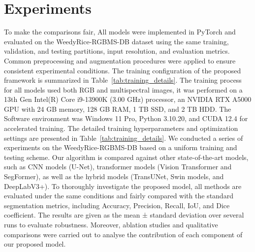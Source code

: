 \documentclass[pdflatex,sn-mathphys-num]{sn-jnl}
\begin{document}
\section{Experiments}
To make the comparisons fair, All models were implemented in PyTorch and evaluated on the WeedyRice-RGBMS-DB dataset
using the same training, validation, and
testing partitions, input resolution, and
evaluation metrics. Common preprocessing
and augmentation procedures were applied
to ensure consistent experimental conditions.
The training configuration of the proposed
framework is summarized in
Table~\ref{tab:training_details}. 
The training process for all models used both RGB and multispectral images, it was performed on a 13th Gen Intel(R) Core i9-13900K (3.00 GHz) processor, an NVIDIA RTX A5000 GPU with 24 GB memory, 128 GB RAM, 1 TB SSD, and 2 TB HDD. The Software environment was Windows 11 Pro, Python 3.10.20, and CUDA 12.4 for accelerated training. The detailed training hyperparameters and optimization settings are presented in Table~\ref{tab:training_details}. We conducted a series of experiments on the WeedyRice-RGBMS-DB based on a uniform training and testing scheme. Our algorithm is compared against other state-of-the-art models, such as CNN models (U-Net), transformer models (Vision Transformer and SegFormer), as well as the hybrid models (TransUNet, Swin models, and DeepLabV3+). To thoroughly investigate the proposed model, all methods are evaluated under the same conditions and fairly compared with the standard segmentation metrics, including Accuracy, Precision, Recall, IoU, and Dice coefficient. The results are given as the mean ± standard deviation over several runs to evaluate robustness. Moreover, ablation studies and qualitative comparisons were carried out to analyse the contribution of each component of our proposed model.
\end{document}
